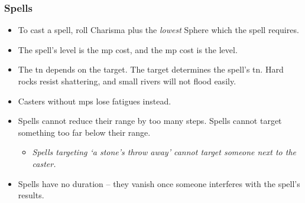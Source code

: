 \subsubsection*{Spells}
\begin{itemize}
  \item
  To cast a spell, roll Charisma plus the \emph{lowest} Sphere which the spell requires.
  \item
  The spell's level is the \gls{mp} cost, and the \gls{mp} cost is the level.
  \item
  The \gls{tn} depends on the target.
  The target determines the spell's \gls{tn}.
  Hard rocks resist shattering, and small rivers will not flood easily.
  \item
  Casters without \glspl{mp} lose \glspl{fatigue} instead.
  \item
  Spells cannot reduce their range by too many \glspl{step}.
  Spells cannot target something too far below their range.
  \begin{itemize}
    \item
    \textit{Spells targeting `a stone's throw away' cannot target someone next to the caster.}
  \end{itemize}
  \item
  Spells have no duration -- they vanish once someone interferes with the spell's results.
\end{itemize}
